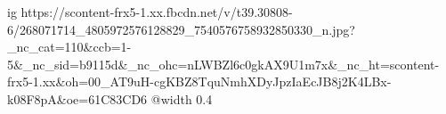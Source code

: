  
 
 
 
 

\ifcmt
  ig https://scontent-frx5-1.xx.fbcdn.net/v/t39.30808-6/268071714_4805972576128829_7540576758932850330_n.jpg?_nc_cat=110&ccb=1-5&_nc_sid=b9115d&_nc_ohc=nLWBZl6c0gkAX9U1m7x&_nc_ht=scontent-frx5-1.xx&oh=00_AT9uH-cgKBZ8TquNmhXDyJpzIaEcJB8j2K4LBx-k08F8pA&oe=61C83CD6
  @width 0.4
\fi
